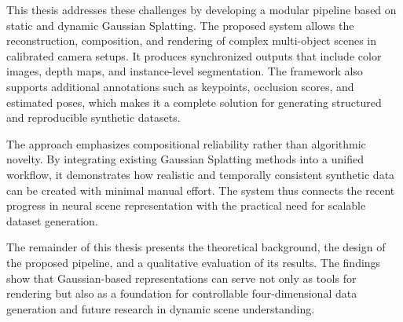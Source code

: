 This thesis addresses these challenges by developing a modular pipeline based on static and dynamic Gaussian Splatting. The proposed system allows the reconstruction, composition, and rendering of complex multi-object scenes in calibrated camera setups. It produces synchronized outputs that include color images, depth maps, and instance-level segmentation. The framework also supports additional annotations such as keypoints, occlusion scores, and estimated poses, which makes it a complete solution for generating structured and reproducible synthetic datasets.

The approach emphasizes compositional reliability rather than algorithmic novelty. By integrating existing Gaussian Splatting methods into a unified workflow, it demonstrates how realistic and temporally consistent synthetic data can be created with minimal manual effort. The system thus connects the recent progress in neural scene representation with the practical need for scalable dataset generation.

The remainder of this thesis presents the theoretical background, the design of the proposed pipeline, and a qualitative evaluation of its results. The findings show that Gaussian-based representations can serve not only as tools for rendering but also as a foundation for controllable four-dimensional data generation and future research in dynamic scene understanding.